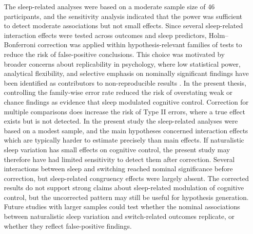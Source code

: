 \documentclass[12pt,a4paper]{report}
\begin{document}
The sleep-related analyses were based on a moderate sample size of 46 participants, and the sensitivity analysis indicated that the power was sufficient to detect moderate associations but not small effects. Since several sleep-related interaction effects were tested across outcomes and sleep predictors, Holm--Bonferroni correction was applied within hypothesis-relevant families of tests to reduce the risk of false-positive conclusions. This choice was motivated by broader concerns about replicability in psychology, where low statistical power, analytical flexibility, and selective emphasis on nominally significant findings have been identified as contributors to non-reproducible results \parencite{opensciencecollaboration2015reproducibility,munafo2017manifesto,simmons2011falsepositive}. In the present thesis, controlling the family-wise error rate reduced the risk of overstating weak or chance findings as evidence that sleep modulated cognitive control. Correction for multiple comparisons does increase the risk of Type II errors, where a true effect exists but is not detected. In the present study the sleep-related analyses were based on a modest sample, and the main hypotheses concerned interaction effects which are typically harder to estimate precisely than main effects. If naturalistic sleep variation has small effects on cognitive control, the present study may therefore have had limited sensitivity to detect them after correction. Several interactions between sleep and switching reached nominal significance before correction, but sleep-related congruency effects were largely absent. The corrected results do not support strong claims about sleep-related modulation of cognitive control, but the uncorrected pattern may still be useful for hypothesis generation. Future studies with larger samples could test whether the nominal associations between naturalistic sleep variation and switch-related outcomes replicate, or whether they reflect false-positive findings.
\end{document}
